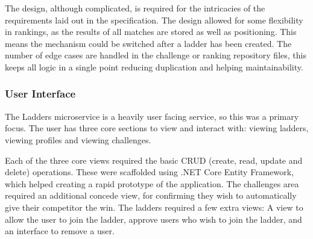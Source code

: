 \par
The design, although complicated, is required for the intricacies of the requirements laid out in the specification. The design allowed for some flexibility in rankings, as the results of all matches are stored as well as positioning. This means the mechanism could be switched after a ladder has been created. The number of edge cases are handled in the challenge or ranking repository files, this keeps all logic in a single point reducing duplication and helping maintainability.

\subsubsection{User Interface}
\par
The Ladders microservice is a heavily user facing service, so this was a primary focus. The user has three core sections to view and interact with: viewing ladders, viewing profiles and viewing challenges.

\par
Each of the three core views required the basic CRUD (create, read, update and delete) operations. These were scaffolded using .NET Core Entity Framework, which helped creating a rapid prototype of the application. The challenges area required an additional concede view, for confirming they wish to automatically give their competitor the win. The ladders required a few extra views: A view to allow the user to join the ladder, approve users who wish to join the ladder, and an interface to remove a user.

